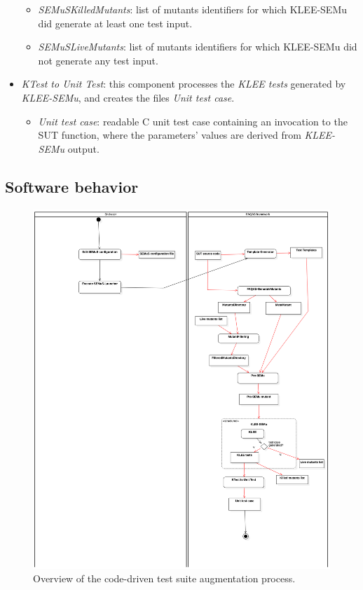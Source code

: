 \begin{itemize}
\begin{itemize}
    \item \emph{SEMuSKilledMutants}: list of mutants identifiers for which KLEE-SEMu did generate at least one test input.
    \item \emph{SEMuSLiveMutants}: list of mutants identifiers for which KLEE-SEMu did not generate any test input.
  \end{itemize}
  \item \emph{KTest to Unit Test}: this component processes the \emph{KLEE tests} generated by \emph{KLEE-SEMu}, and creates the files \emph{Unit test case}.
  \begin{itemize}
    \item \emph{Unit test case}: readable C unit test case containing an invocation to the SUT function, where the parameters' values are derived from \emph{KLEE-SEMu} output.
  \end{itemize}
\end{itemize}


\subsection{Software behavior}


\begin{figure}[tb]
  \centering
  \includegraphics[width=\textwidth]{images/semus-activity.pdf}
      \caption{Overview of the code-driven test suite augmentation process.}
      \label{fig:process:codeDriven:augmentation}
\end{figure}

